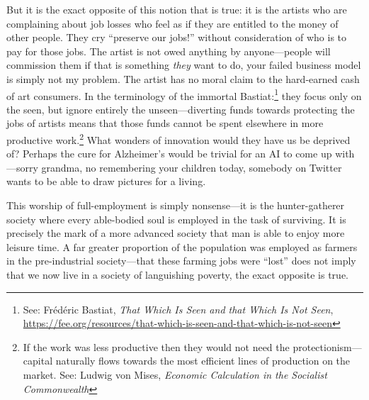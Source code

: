 \documentclass[11pt]{article}
\begin{document}
But it is the exact opposite of this notion that is true: it is the artists who are complaining about job losses who feel as if they are entitled to the money of other people. They cry ``preserve our jobs!'' without consideration of who is to pay for those jobs. The artist is not owed anything by anyone---people will commission them if that is something \emph{they} want to do, your failed business model is simply not my problem. The artist has no moral claim to the hard-earned cash of art consumers. In the terminology of the immortal Bastiat:\footnote{See: Frédéric Bastiat, \emph{That Which Is Seen and that Which Is Not Seen}, \url{https://fee.org/resources/that-which-is-seen-and-that-which-is-not-seen}} they focus only on the seen, but ignore entirely the unseen---diverting funds towards protecting the jobs of artists means that those funds cannot be spent elsewhere in more productive work.\footnote{If the work was less productive then they would not need the protectionism---capital naturally flows towards the most efficient lines of production on the market. See: Ludwig von Mises, \emph{Economic Calculation in the Socialist Commonwealth}} What wonders of innovation would they have us be deprived of? Perhaps the cure for Alzheimer's would be trivial for an AI to come up with---sorry grandma, no remembering your children today, somebody on Twitter wants to be able to draw pictures for a living.

This worship of full-employment is simply nonsense---it is the hunter-gatherer society where every able-bodied soul is employed in the task of surviving. It is precisely the mark of a more advanced society that man is able to enjoy more leisure time. A far greater proportion of the population was employed as farmers in the pre-industrial society---that these farming jobs were ``lost'' does not imply that we now live in a society of languishing poverty, the exact opposite is true.
\end{document}
